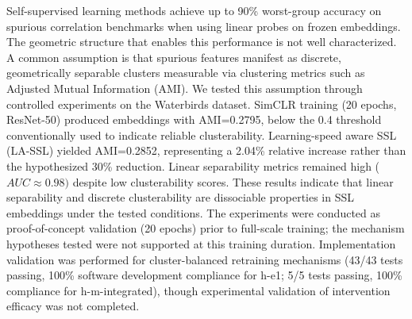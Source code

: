 
Self-supervised learning methods achieve up to 90\% worst-group accuracy on spurious correlation benchmarks when using linear probes on frozen embeddings. The geometric structure that enables this performance is not well characterized. A common assumption is that spurious features manifest as discrete, geometrically separable clusters measurable via clustering metrics such as Adjusted Mutual Information (AMI). We tested this assumption through controlled experiments on the Waterbirds dataset. SimCLR training (20 epochs, ResNet-50) produced embeddings with AMI=0.2795, below the 0.4 threshold conventionally used to indicate reliable clusterability. Learning-speed aware SSL (LA-SSL) yielded AMI=0.2852, representing a 2.04\% relative increase rather than the hypothesized 30\% reduction. Linear separability metrics remained high ($AUC\approx 0.98)$ despite low clusterability scores. These results indicate that linear separability and discrete clusterability are dissociable properties in SSL embeddings under the tested conditions. The experiments were conducted as proof-of-concept validation (20 epochs) prior to full-scale training; the mechanism hypotheses tested were not supported at this training duration. Implementation validation was performed for cluster-balanced retraining mechanisms (43/43 tests passing, 100\% software development compliance for h-e1; 5/5 tests passing, 100\% compliance for h-m-integrated), though experimental validation of intervention efficacy was not completed.
